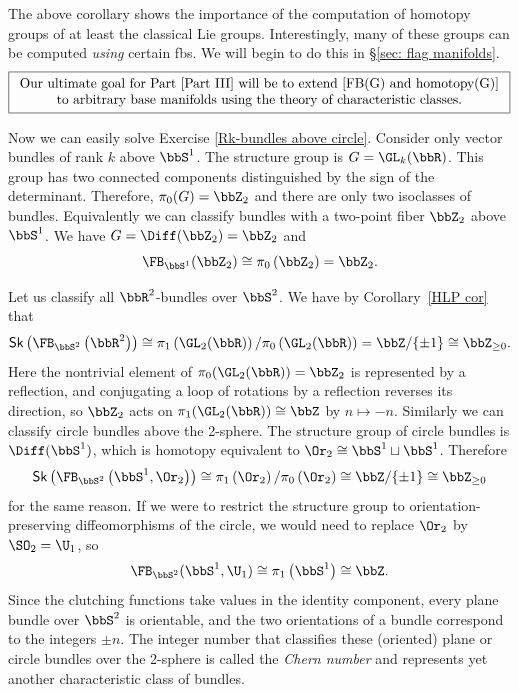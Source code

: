 The above corollary shows the importance of the computation of homotopy groups of at least the classical Lie groups. Interestingly, many of these groups can be computed \emph{using} certain \glspl{fb}. We will begin to do this in \S\ref{sec: flag manifolds}.
\begin{equation*}
    \boxed{\begin{array}{c}
        \text{Our ultimate goal for Part \ref{Part III} will be to extend \eqref{FB(G) and homotopy(G)}}\\
        \text{to arbitrary base manifolds using the theory of characteristic classes.}
    \end{array}}
\end{equation*}



\begin{example}
    Now we can easily solve Exercise \ref{Rk-bundles above circle}. Consider only vector bundles of rank $k$ above $\bbS^1$. The structure group is $G=\GL_k(\bbR)$. This group has two connected components distinguished by the sign of the determinant. Therefore, $\pi_0(G)=\bbZ_2$ and there are only two isoclasses of bundles. Equivalently we can classify bundles with a two-point fiber $\bbZ_2$ above $\bbS^1$. We have $G=\Diff(\bbZ_2)=\bbZ_2$ and
    \[
        \FB_{\bbS^1}(\bbZ_2)\cong \pi_{0}\left(\bbZ_2\right)=\bbZ_2.
    \]
    \end{example}
    \begin{example}
    Let us classify all $\bbR^2$-bundles over $\bbS^2$. We have by Corollary~\ref{HLP cor} that 
    \[
        \mathsf{Sk}\left(\FB_{\bbS^2}\left(\bbR^2\right)\right)\cong \pi_{1}\left(\GL_2(\bbR )\right)/\pi_0\left(\GL_2(\bbR )\right)=\bbZ/\{\pm1\}\cong \bbZ_{\geq 0}.
    \]
    Here the nontrivial element of $\pi_0(\GL_2(\bbR))=\bbZ_2$ is represented by a reflection, and conjugating a loop of rotations by a reflection reverses its direction, so $\bbZ_2$ acts on $\pi_1(\GL_2(\bbR))\cong\bbZ$ by $n\mapsto -n$.
    Similarly we can classify circle bundles above the 2-sphere. The structure group of circle bundles is $\Diff(\bbS^1)$, which is homotopy equivalent to $\Or_2\cong \bbS^1\sqcup \bbS^1$. Therefore
    \[
        \mathsf{Sk}\left(\FB_{\bbS^2}\left(\bbS^1,\Or_2\right)\right)\cong \pi_{1}\left(\Or_2\right)/\pi_0\left(\Or_2\right)\cong\bbZ/\{\pm1\}\cong\bbZ_{\geq 0}
    \]
    for the same reason. If we were to restrict the structure group to orientation-preserving diffeomorphisms of the circle, we would need to replace $\Or_2$ by $\SO_2=\U_1$, so 
    \[
        \FB_{\bbS^2}(\bbS^1,\U_1)\cong \pi_{1}\left(\bbS^1\right)\cong\bbZ.
    \]
    Since the clutching functions take values in the identity component, every plane bundle over $\bbS^2$ is orientable, and the two orientations of a bundle correspond to the integers $\pm n$. The integer number that classifies these (oriented) plane or circle bundles over the 2-sphere is called the \emph{Chern number} and represents yet another characteristic class of bundles.
\end{example}


